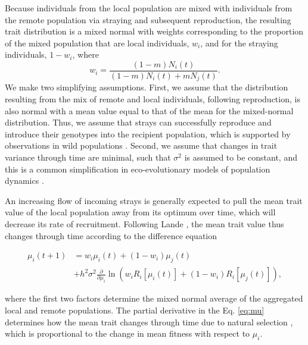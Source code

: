 \documentclass[twocolumn,preprintnumbers,amsmath,amssymb,superscriptaddress]{revtex4}
\begin{document}
\noindent Because individuals from the local population are mixed with individuals from the remote population via straying and subsequent reproduction, the resulting trait distribution is a mixed normal with weights corresponding to the proportion of the mixed population that are local individuals, $w_i$, and for the straying individuals, $1-w_i$, where 
\begin{equation}
w_i=\frac{(1-m)N_i(t)}{(1-m) N_i(t) + m N_j(t)}.
\end{equation}
We make two simplifying assumptions.
First, we assume that the distribution resulting from the mix of remote and local individuals, following reproduction, is also normal with a mean value equal to that of the mean for the mixed-normal distribution.
Thus, we assume that strays can successfully reproduce and introduce their genotypes into the recipient population, which is supported by observations in wild populations \cite{Jasper:2013cc}.
Second, we assume that changes in trait variance through time are minimal, such that $\sigma^2$ is assumed to be constant, and this is a common simplification in eco-evolutionary models of population dynamics \cite{Lande:1976ga,Schreiber:2011wx,Gilbert:2014ee,Gibert:2015kc}.



An increasing flow of incoming strays is generally expected to pull the mean trait value of the local population away from its optimum over time, which will decrease its rate of recruitment.
Following Lande \cite{Lande:1976ga}, the mean trait value thus changes through time according to the difference equation

\begin{align}
  \label{eq:mu}
  \mu_i(t+1) &= w_i\mu_i(t) + (1-w_i)\mu_j(t) \\ \nonumber
  &+ h^2\sigma^2\frac{\partial}{\partial \mu_i}\ln\left(w_i R_i[\mu_i(t)] + (1-w_i)R_i[\mu_j(t)]  \right),
\end{align}

\noindent where the first two factors determine the mixed normal average of the aggregated local and remote populations.
The partial derivative in the Eq. \ref{eq:mu} determines how the mean trait changes through time due to natural selection \cite{Lande:1976ga}, which is proportional to the change in mean fitness with respect to $\mu_i$.
\\
\end{document}
